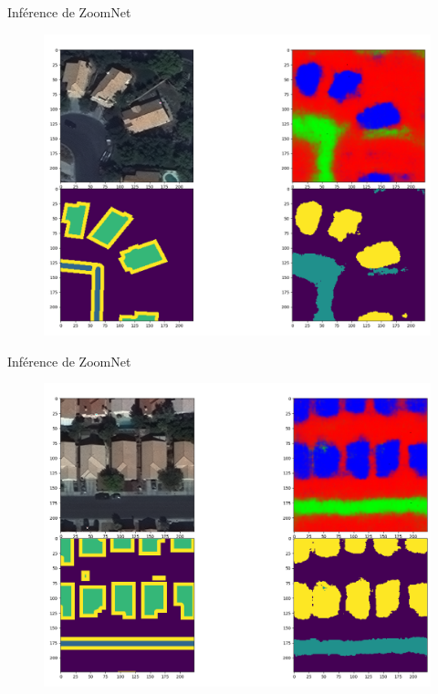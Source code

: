 \documentclass[11pt]{beamer}
\begin{document}
\begin{frame}{Inférence de ZoomNet}
	\begin{figure}[H]
		\centering
		\includegraphics[scale=0.2]{Images/ZoomNet_1983.png}
	\end{figure}
\end{frame}

\begin{frame}{Inférence de ZoomNet}
	\begin{figure}[H]
		\centering
		\includegraphics[scale=0.2]{Images/ZoomNet_5000.png}
	\end{figure}
\end{frame}
\end{document}
